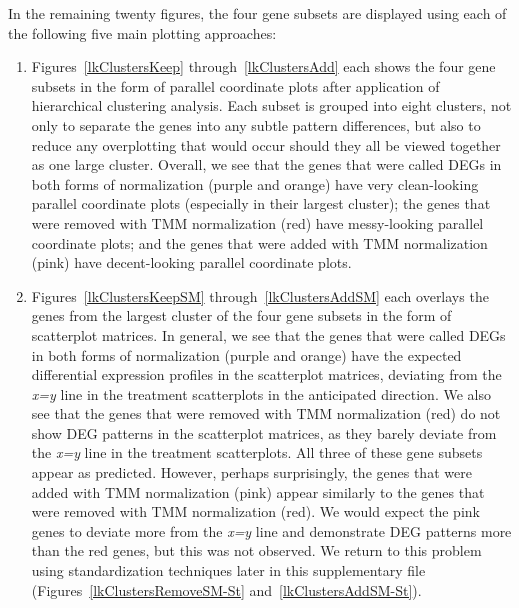 \documentclass{article}
\begin{document}
  \noindent
  In the remaining twenty figures, the four gene subsets are displayed using each of the following five main plotting approaches:
  
  \begin{enumerate}
  
  \item Figures~\ref{lkClustersKeep} through~\ref{lkClustersAdd} each shows the four gene subsets in the form of parallel coordinate plots after application of hierarchical clustering analysis. Each subset is grouped into eight clusters, not only to separate the genes into any subtle pattern differences, but also to reduce any overplotting that would occur should they all be viewed together as one large cluster. Overall, we see that the genes that were called DEGs in both forms of normalization (purple and orange) have very clean-looking parallel coordinate plots (especially in their largest cluster); the genes that were removed with TMM normalization (red) have messy-looking parallel coordinate plots; and the genes that were added with TMM normalization (pink) have decent-looking parallel coordinate plots.
  
  \item Figures~\ref{lkClustersKeepSM} through~\ref{lkClustersAddSM} each overlays the genes from the largest cluster of the four gene subsets in the form of scatterplot matrices. In general, we see that the genes that were called DEGs in both forms of normalization (purple and orange) have the expected differential expression profiles in the scatterplot matrices, deviating from the \textit{x=y} line in the treatment scatterplots in the anticipated direction. We also see that the genes that were removed with TMM normalization (red) do not show DEG patterns in the scatterplot matrices, as they barely deviate from the \textit{x=y} line in the treatment scatterplots. All three of these gene subsets appear as predicted. However, perhaps surprisingly, the genes that were added with TMM normalization (pink) appear similarly to the genes that were removed with TMM normalization (red). We would expect the pink genes to deviate more from the \textit{x=y} line and demonstrate DEG patterns more than the red genes, but this was not observed. We return to this problem using standardization techniques later in this supplementary file (Figures~\ref{lkClustersRemoveSM-St} and~\ref{lkClustersAddSM-St}).
  

\end{enumerate}
\end{document}
